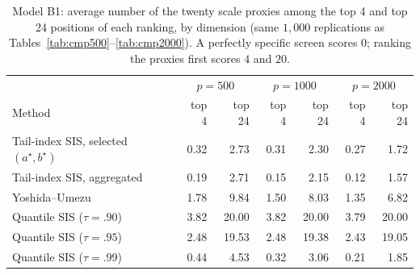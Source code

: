 \begin{table}[t]
\centering
\caption{Model B1: average number of the twenty scale proxies among the
top 4 and top 24 positions of each ranking, by dimension (same
$1{,}000$ replications as Tables~\ref{tab:cmp500}--\ref{tab:cmp2000}).
A perfectly specific screen scores $0$; ranking the proxies first
scores $4$ and $20$.}
\label{tab:b1comp}
\begin{tabular}{lrrrrrr}
\toprule
 & \multicolumn{2}{c}{$p=500$} & \multicolumn{2}{c}{$p=1000$}
 & \multicolumn{2}{c}{$p=2000$}\\
Method & top 4 & top 24 & top 4 & top 24 & top 4 & top 24\\
\midrule
Tail-index SIS, selected $(a^\star,b^\star)$ & 0.32 & 2.73 & 0.31 & 2.30 & 0.27 & 1.72\\
Tail-index SIS, aggregated & 0.19 & 2.71 & 0.15 & 2.15 & 0.12 & 1.57\\
Yoshida--Umezu & 1.78 & 9.84 & 1.50 & 8.03 & 1.35 & 6.82\\
Quantile SIS ($\tau=.90$) & 3.82 & 20.00 & 3.82 & 20.00 & 3.79 & 20.00\\
Quantile SIS ($\tau=.95$) & 2.48 & 19.53 & 2.48 & 19.38 & 2.43 & 19.05\\
Quantile SIS ($\tau=.99$) & 0.44 & 4.53 & 0.32 & 3.06 & 0.21 & 1.85\\
\bottomrule
\end{tabular}
\end{table}
